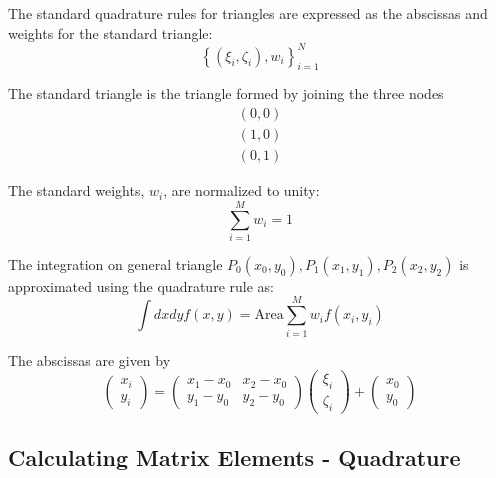 \documentclass [10pt,letterpaper]{article}
\begin{document}
The standard quadrature rules for triangles are expressed as the abscissas and weights for the standard triangle:
\begin{equation} \label{eq:standard-triangle-quadrature-rule}
	\left\{
		\left(
			\xi_i,\zeta_i
		\right)
		,w_i 
	\right\}_{i=1}^{N}
\end{equation}

The standard triangle is the triangle formed by joining the three nodes
\begin{equation} \label{eq:standard-triangle-coordinates}
	\begin{split}
		(0,0)		\\
		(1,0)		\\
		(0,1)
	\end{split}
\end{equation}

The standard weights, $w_i$, are normalized to unity:
\begin{equation} \label{eq:standard-weights-normalized-to-one}
	\sum \limits_{i=1}^{M} w_i = 1
\end{equation}

The integration on general triangle $P_0(x_0,y_0),P_1(x_1,y_1),P_2(x_2,y_2)$ is approximated using the quadrature rule as:
\begin{equation} \label{eq:general-triangle-numerical-integration-quadrature}
	\int dxdy f(x,y)
	=
		\text{Area}
		\sum \limits_{i=1}^{M}
		w_i
		f(x_i,y_i)
\end{equation}

The abscissas are given by
\begin{equation} \label{eq:transform-xi-yi-xii-zetai}
	\begin{pmatrix}
		x_i	\\
		y_i
	\end{pmatrix}
	=
		\begin{pmatrix}
			x_1-x_0		&	x_2 - x_0	\\
			y_1-y_0		&	y_2 - y_0
		\end{pmatrix}
		\begin{pmatrix}
			\xi_i	\\
			\zeta_i
		\end{pmatrix}
		+
		\begin{pmatrix}
			x_0	\\
			y_0
		\end{pmatrix}
\end{equation}


\subsection{Calculating Matrix Elements - Quadrature}
\label{sub:calculating-matrix-elements-quadrature}
\end{document}
